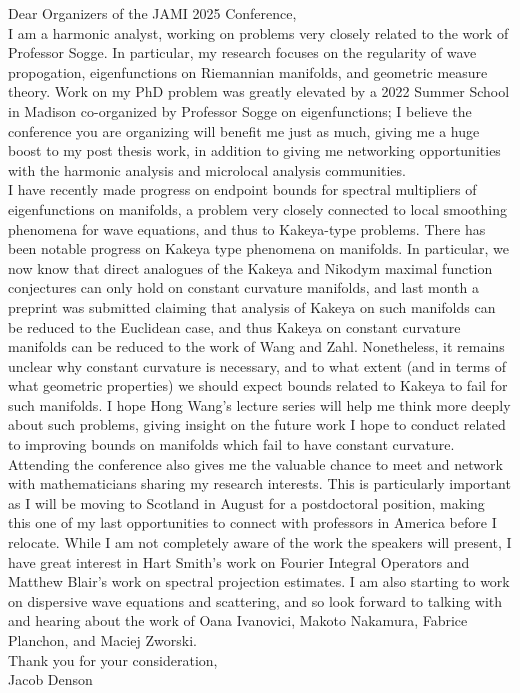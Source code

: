 \documentclass[12pt]{article}
\title{}
\author{}
\date{}
\begin{document}
\maketitle

\thispagestyle{empty}

Dear Organizers of the JAMI 2025 Conference,
\\

I am a harmonic analyst, working on problems very closely related to the work of Professor Sogge. In particular, my research focuses on the regularity of wave propogation,  eigenfunctions on Riemannian manifolds, and geometric measure theory. Work on my PhD problem was greatly elevated by a 2022 Summer School in Madison co-organized by Professor Sogge on eigenfunctions; I believe the conference you are organizing will benefit me just as much, giving me a huge boost to my post thesis work, in addition to giving me networking opportunities with the harmonic analysis and microlocal analysis communities. \\

I have recently made progress on endpoint bounds for spectral multipliers of eigenfunctions on manifolds, a problem very closely connected to local smoothing phenomena for wave equations, and thus to Kakeya-type problems. There has been notable progress on Kakeya type phenomena on manifolds. In particular, we now know that direct analogues of the Kakeya and Nikodym maximal function conjectures can only hold on constant curvature manifolds, and last month a preprint was submitted claiming that analysis of Kakeya on such manifolds can be reduced to the Euclidean case, and thus Kakeya on constant curvature manifolds can be reduced to the work of Wang and Zahl. Nonetheless, it remains unclear why constant curvature is necessary, and to what extent (and in terms of what geometric properties) we should expect bounds related to Kakeya to fail for such manifolds. I hope Hong Wang's lecture series will help me think more deeply about such problems, giving insight on the future work I hope to conduct related to improving bounds on manifolds which fail to have constant curvature.\\

Attending the conference also gives me the valuable chance to meet and network with mathematicians sharing my research interests. This is particularly important as I will be moving to Scotland in August for a postdoctoral position, making this one of my last opportunities to connect with professors in America before I relocate. While I am not completely aware of the work the speakers will present, I have great interest in Hart Smith's work on Fourier Integral Operators and Matthew Blair's work on spectral projection estimates. I am also starting to work on dispersive wave equations and scattering, and so look forward to talking with and hearing about the work of Oana Ivanovici, Makoto Nakamura, Fabrice Planchon, and Maciej Zworski. \\

\noindent Thank you for your consideration, \\

\noindent Jacob Denson
\end{document}
